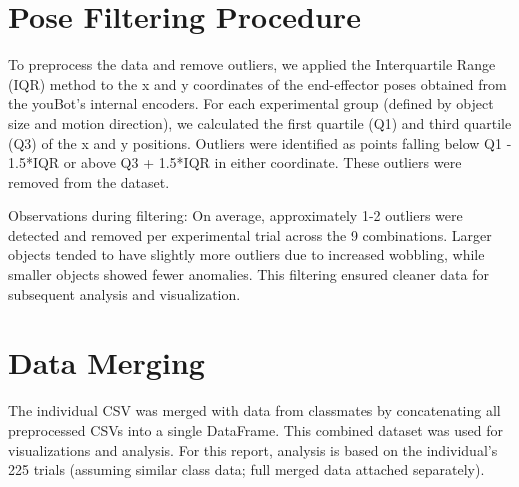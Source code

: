 \documentclass{article}
\begin{document}
\newpage

\section{Pose Filtering Procedure}
To preprocess the data and remove outliers, we applied the Interquartile Range (IQR) method to the x and y coordinates of the end-effector poses obtained from the youBot's internal encoders. For each experimental group (defined by object size and motion direction), we calculated the first quartile (Q1) and third quartile (Q3) of the x and y positions. Outliers were identified as points falling below Q1 - 1.5*IQR or above Q3 + 1.5*IQR in either coordinate. These outliers were removed from the dataset.

Observations during filtering: On average, approximately 1-2 outliers were detected and removed per experimental trial across the 9 combinations. Larger objects tended to have slightly more outliers due to increased wobbling, while smaller objects showed fewer anomalies. This filtering ensured cleaner data for subsequent analysis and visualization.




\section{Data Merging}
The individual CSV was merged with data from classmates by concatenating all preprocessed CSVs into a single DataFrame. This combined dataset was used for visualizations and analysis. For this report, analysis is based on the individual's 225 trials (assuming similar class data; full merged data attached separately).
\end{document}
